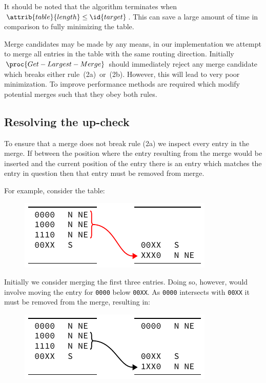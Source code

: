 \documentclass[conference]{IEEEtran}
\newcommand{\mytt}[1]{\texttt{\footnotesize#1}}
\begin{document}
  It should be noted that the algorithm terminates when $\attrib{table}{length} \le \id{target}$.
  This can save a large amount of time in comparison to fully minimizing the table.

  Merge candidates may be made by any means, in our implementation we attempt to merge all entries in the table with the same routing direction.
  Initially $\proc{Get-Largest-Merge}$ should immediately reject any merge candidate which breaks either rule~(2a)~or~(2b).
  However, this will lead to very poor minimization.
  To improve performance methods are required which modify potential merges such that they obey both rules.

  \subsection{Resolving the up-check}

  To ensure that a merge does not break rule (2a) we inspect every entry in the merge.
  If between the position where the entry resulting from the merge would be inserted and the current position of the entry there is an entry which matches the entry in question then that entry must be removed from merge.

  For example, consider the table:

  \begin{figure}[H]
    \centering
    \includegraphics{figures/upcheck_resolve_example_1}
  \end{figure}

  \noindent Initially we consider merging the first three entries.
  Doing so, however, would involve moving the entry for \mytt{0000} below \mytt{00XX}.
  As \mytt{0000} intersects with \mytt{00XX} it must be removed from the merge, resulting in:

  \begin{figure}[H]
    \centering
    \includegraphics{figures/upcheck_resolve_example_2}
  \end{figure}
\end{document}
